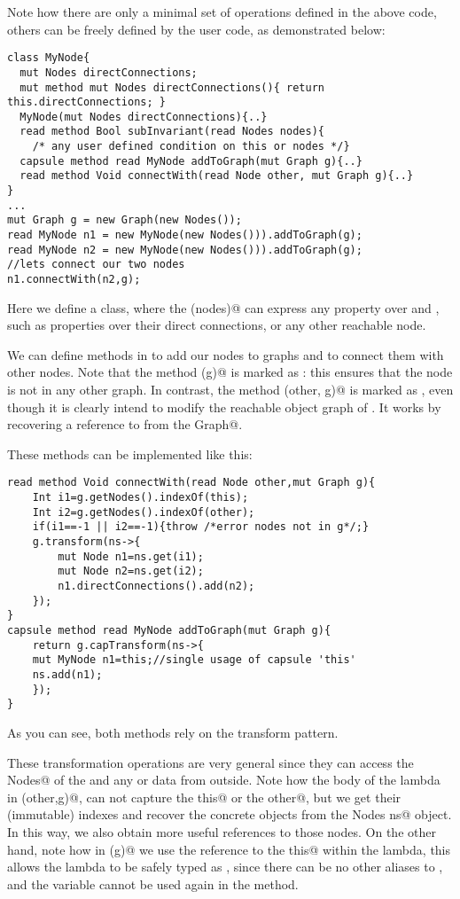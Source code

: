 Note how there are only a minimal set of operations defined in the above code, 
others can be freely defined by the user code, as demonstrated below:

\begin{lstlisting}
class MyNode{
  mut Nodes directConnections;
  mut method mut Nodes directConnections(){ return this.directConnections; }
  MyNode(mut Nodes directConnections){..}
  read method Bool subInvariant(read Nodes nodes){
    /* any user defined condition on this or nodes */}  
  capsule method read MyNode addToGraph(mut Graph g){..}
  read method Void connectWith(read Node other, mut Graph g){..}
}
...
mut Graph g = new Graph(new Nodes());
read MyNode n1 = new MyNode(new Nodes())).addToGraph(g);
read MyNode n2 = new MyNode(new Nodes())).addToGraph(g);
//lets connect our two nodes
n1.connectWith(n2,g);
\end{lstlisting}
Here we define a \Q@MyNode@ class, where the \Q@subInvariant(nodes)@ can express any property over \Q@this@ and \Q@nodes@, such as properties over their direct connections, or any other reachable node.

We can define methods in \Q@MyNode@ to add our nodes
to graphs and to connect them with other nodes.
Note that the method \Q@addToGraph(g)@ is marked as \Q@capsule@: this ensures that the node is not in any other graph.
In contrast, the method \Q@connectWith(other, g)@ is marked as \Q@read@, even though it is clearly intend to modify the reachable object graph of \Q@this@.
It works by recovering a \Q@mut@ reference to \Q@this@ from the \Q@mut Graph@.

These methods can be implemented like this:
\begin{lstlisting}
read method Void connectWith(read Node other,mut Graph g){
	Int i1=g.getNodes().indexOf(this);
	Int i2=g.getNodes().indexOf(other);
	if(i1==-1 || i2==-1){throw /*error nodes not in g*/;}
	g.transform(ns->{
		mut Node n1=ns.get(i1);
		mut Node n2=ns.get(i2);
		n1.directConnections().add(n2);
	});
}
capsule method read MyNode addToGraph(mut Graph g){
	return g.capTransform(ns->{
	mut MyNode n1=this;//single usage of capsule 'this'
	ns.add(n1);
	});
}
\end{lstlisting}
As you can see, both methods rely on the transform pattern.

These transformation operations are very general since they
can access the \Q@mut Nodes@ of the \Q@Graph@ and 
any \Q@rep@ or \Q@imm@ data from outside.
Note how the body of the \Q@capsule@ lambda in \Q@connectWith(other,g)@, can not capture the \Q@read this@ or the \Q@read other@, but we get their (immutable) indexes 
and recover the concrete objects from the \Q@mut Nodes ns@ object.
In this way, we also obtain more useful \Q@mut@ references to those nodes.
On the other hand, note how in \Q@addToGraph(g)@ we use the reference to the \Q@capsule this@ within the lambda, this allows the lambda to be safely typed as \Q@capsule@, since there can be no other aliases to \Q@this@, and the \Q@this@ variable cannot be used again in the method.

